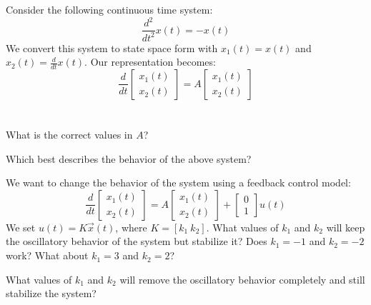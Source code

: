 
\begin{enumerate}

\qitem Consider the following continuous time system:
$$
\frac{d^2}{dt^2} x(t) = -x(t)
$$
We convert this system to state space form with $x_1(t) = x(t)$ and $x_2(t) = \frac{d}{dt} x(t)$. Our representation becomes:
$$
\frac{d}{dt}
\begin{bmatrix}
x_1(t) \\
x_2(t)
\end{bmatrix}
=
A
\begin{bmatrix}
x_1(t) \\
x_2(t)
\end{bmatrix}
$$
\\ \\
What is the correct values in $A$?


\qitem
Which best describes the behavior of the above system?



\qitem
We want to change the behavior of the system using a feedback control model:
$$
\frac{d}{dt}
\begin{bmatrix}
x_1(t) \\
x_2(t)
\end{bmatrix}
=
A
\begin{bmatrix}
x_1(t) \\
x_2(t)
\end{bmatrix}
+ 
\begin{bmatrix}
0 \\
1
\end{bmatrix}
u(t)
$$
We set $u(t) = K\vec{x}(t)$, where $K = [k_1~k_2]$. What values of $k_1$ and $k_2$ will keep the oscillatory behavior of the system but stabilize it? Does $k_1 = -1$ and $k_ 2 = -2$ work? What about $k_1 = 3$ and $k_ 2 = 2$?




\qitem
What values of $k_1$ and $k_2$ will remove the oscillatory behavior completely and still stabilize the system?





\end{enumerate}
